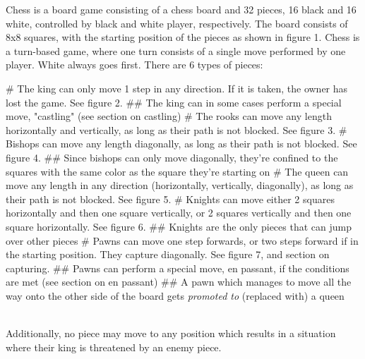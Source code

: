 \documentclass{article}
\begin{document}
Chess is a board game consisting of a chess board and 32 pieces, 16 black and 16 white, controlled by black and white player, respectively. The board consists of 8x8 squares, with the starting position of the pieces as shown in figure 1. Chess is a turn-based game, where one turn consists of a single move performed by one player. White always goes first. There are 6 types of pieces:

\begin{easylist}[itemize]
# The king can only move 1 step in any direction. If it is taken, the owner has lost the game. See figure 2.
## The king can in some cases perform a special move, "castling" (see section on castling)
# The rooks can move any length horizontally and vertically, as long as their path is not blocked. See figure 3.
# Bishops can move any length diagonally, as long as their path is not blocked. See figure 4.
## Since bishops can only move diagonally, they're confined to the squares with the same color as the square they're starting on
# The queen can move any length in any direction (horizontally, vertically, diagonally), as long as their path is not blocked. See figure 5.
# Knights can move either 2 squares horizontally and then one square vertically, or 2 squares vertically and then one square horizontally. See figure 6.
## Knights are the only pieces that can jump over other pieces
# Pawns can move one step forwards, or two steps forward if in the starting position. They capture diagonally. See figure 7, and section on capturing.
## Pawns can perform a special move, en passant, if the conditions are met (see section on en passant)
## A pawn which manages to move all the way onto the other side of the board gets \textit{promoted to} (replaced with) a queen
\end{easylist}\mbox{}\\

\noindent
Additionally, no piece may move to any position which results in a situation where their king is threatened by an enemy piece.
\end{document}
